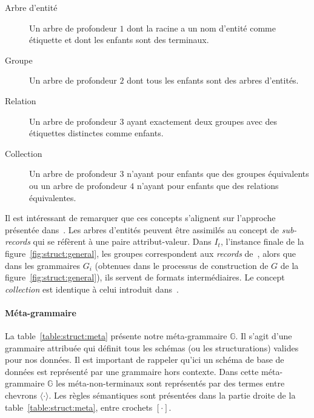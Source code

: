\begin{description}
    \item[Arbre d'entité] Un arbre de profondeur $1$ dont la racine a un nom d'entité comme étiquette et dont les enfants sont des terminaux.

    \item[Groupe] Un arbre de profondeur $2$ dont tous les enfants sont des arbres d'entités.

    \item[Relation] Un arbre de profondeur $3$ ayant exactement deux groupes avec des étiquettes distinctes comme enfants.

    \item[Collection] Un arbre de profondeur $3$ n'ayant pour enfants que des groupes équivalents ou un arbre de profondeur $4$ n'ayant pour enfants que des relations équivalentes.
\end{description}

Il est intéressant de remarquer que ces concepts s'alignent sur l'approche présentée dans~\cite{barretAbstraGenericAbstractions2022}.
Les arbres d'entités peuvent être assimilés au concept de \emph{sub-records} qui se réfèrent à une paire attribut-valeur.
Dans $I_t$, l'instance finale de la figure~\ref{fig:struct:general}, les groupes correspondent aux \emph{records} de~\cite{barretAbstraGenericAbstractions2022}, alors que dans les grammaires $G_i$ (obtenues dans le processus de construction de $G$ de la figure~\ref{fig:struct:general}), ils servent de formats intermédiaires.
Le concept \textit{collection} est identique à celui introduit dans~\cite{barretAbstraGenericAbstractions2022}.

\paragraph{Méta-grammaire}
La table~\ref{table:struct:meta} présente notre méta-grammaire $\mathbb{G}$.
Il s'agit d'une grammaire attribuée qui définit tous les schémas (ou les structurations) valides pour nos données.
Il est important de rappeler qu'ici un schéma de base de données est représenté par une grammaire hors contexte.
Dans cette méta-grammaire $\mathbb{G}$ les méta-non-terminaux sont représentés par des termes entre chevrons $\langle \cdot \rangle$.
Les règles sémantiques sont présentées dans la partie droite de la table~\ref{table:struct:meta}, entre crochets $[ \cdot ]$.

